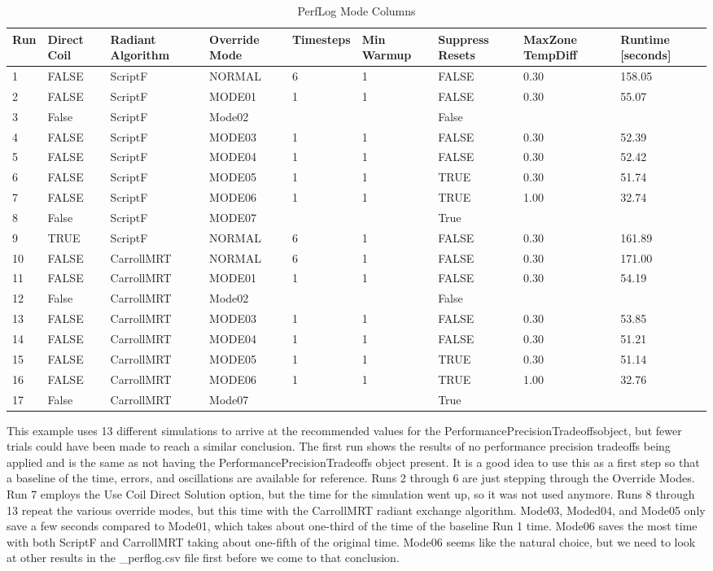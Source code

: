 {\scriptsize
\begin{longtable}[c]{p{0.2in}p{0.4in}p{0.6in}p{0.6in}p{0.5in}p{0.5in}p{0.6in}p{0.6in}p{0.65in}}
\caption{PerfLog Mode Columns\label{table:perflog_mode_columns}} \tabularnewline
\toprule
Run & 
Direct Coil & 
Radiant Algorithm & 
Override Mode & 
Timesteps& 
Min Warmup& 
Suppress Resets & 
MaxZone TempDiff & 
Runtime {[}seconds{]} \tabularnewline
\midrule
\endfirsthead

1  & FALSE & ScriptF    & NORMAL & 6 & 1 & FALSE & 0.30 & 158.05 \tabularnewline
2  & FALSE & ScriptF    & MODE01 & 1 & 1 & FALSE & 0.30 & 55.07  \tabularnewline
3  & False & ScriptF    & Mode02 &   &   & False &      &        \tabularnewline
4  & FALSE & ScriptF    & MODE03 & 1 & 1 & FALSE & 0.30 & 52.39  \tabularnewline
5  & FALSE & ScriptF    & MODE04 & 1 & 1 & FALSE & 0.30 & 52.42  \tabularnewline
6  & FALSE & ScriptF    & MODE05 & 1 & 1 & TRUE  & 0.30 & 51.74  \tabularnewline
7  & FALSE & ScriptF    & MODE06 & 1 & 1 & TRUE  & 1.00 & 32.74  \tabularnewline
8  & False & ScriptF    & MODE07 &   &   & True  &      &        \tabularnewline
9  & TRUE  & ScriptF    & NORMAL & 6 & 1 & FALSE & 0.30 & 161.89 \tabularnewline
10 & FALSE & CarrollMRT & NORMAL & 6 & 1 & FALSE & 0.30 & 171.00 \tabularnewline
11 & FALSE & CarrollMRT & MODE01 & 1 & 1 & FALSE & 0.30 & 54.19  \tabularnewline
12 & False & CarrollMRT & Mode02 &   &   & False &      &        \tabularnewline
13 & FALSE & CarrollMRT & MODE03 & 1 & 1 & FALSE & 0.30 & 53.85  \tabularnewline
14 & FALSE & CarrollMRT & MODE04 & 1 & 1 & FALSE & 0.30 & 51.21  \tabularnewline
15 & FALSE & CarrollMRT & MODE05 & 1 & 1 & TRUE  & 0.30 & 51.14  \tabularnewline
16 & FALSE & CarrollMRT & MODE06 & 1 & 1 & TRUE  & 1.00 & 32.76  \tabularnewline
17 & False & CarrollMRT & Mode07 &   &   & True  &      &        \tabularnewline

\bottomrule
\end{longtable}
}

This example uses 13 different simulations to arrive at the recommended values for the PerformancePrecisionTradeoffsobject, but fewer trials could have been made to reach a similar conclusion. The first run shows the results of no performance precision tradeoffs being applied and is the same as not having the PerformancePrecisionTradeoffs object present. It is a good idea to use this as a first step so that a baseline of the time, errors, and oscillations are available for reference.  Runs 2 through 6 are just stepping through the Override Modes. Run 7 employs the Use Coil Direct Solution option, but the time for the simulation went up, so it was not used anymore.  Runs 8 through 13 repeat the various override modes, but this time with the CarrollMRT radiant exchange algorithm. Mode03, Moded04, and Mode05 only save a few seconds compared to Mode01, which takes about one-third of the time of the baseline Run 1 time. Mode06 saves the most time with both ScriptF and CarrollMRT taking about one-fifth of the original time. Mode06 seems like the natural choice, but we need to look at other results in the \_perflog.csv file first before we come to that conclusion.

